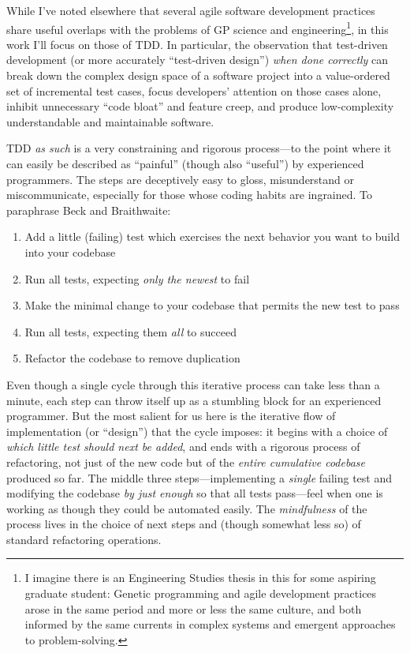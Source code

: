 While I've noted elsewhere that several agile software development practices share useful overlaps with the problems of GP science and engineering\footnote{I imagine there is an Engineering Studies thesis in this for some aspiring graduate student: Genetic programming and agile development practices arose in the same period and more or less the same culture, and both informed by the same currents in complex systems and emergent approaches to problem-solving.}, in this work I'll focus on those of TDD. In particular, the observation that test-driven development (or more accurately ``test-driven design'') \emph{when done correctly} can break down the complex design space of a software project into a value-ordered set of incremental test cases, focus developers' attention on those cases alone, inhibit unnecessary ``code bloat'' and feature creep, and produce low-complexity understandable and maintainable software.

TDD \emph{as such} is a very constraining and rigorous process---to the point where it can easily be described as ``painful'' (though also ``useful'') by experienced programmers. The steps are deceptively easy to gloss, misunderstand or miscommunicate, especially for those whose coding habits are ingrained. To paraphrase Beck and Braithwaite:

\begin{enumerate}
\item Add a little (failing) test which exercises the next behavior you want to build into your codebase
\item Run all tests, expecting \emph{only the newest} to fail
\item Make the minimal change to your codebase that permits the new test to pass
\item Run all tests, expecting them \emph{all} to succeed
\item Refactor the codebase to remove duplication
\end{enumerate}

Even though a single cycle through this iterative process can take less than a minute, each step can throw itself up as a stumbling block for an experienced programmer. But the most salient for us here is the iterative flow of implementation (or ``design'') that the cycle imposes: it begins with a choice of \emph{which little test should next be added}, and ends with a rigorous process of refactoring, not just of the new code but of the \emph{entire cumulative codebase} produced so far. The middle three steps---implementing a \emph{single} failing test and modifying the codebase \emph{by just enough} so that all tests pass---feel when one is working as though they could be automated easily. The \emph{mindfulness} of the process lives in the choice of next steps and (though somewhat less so) of standard refactoring operations.

